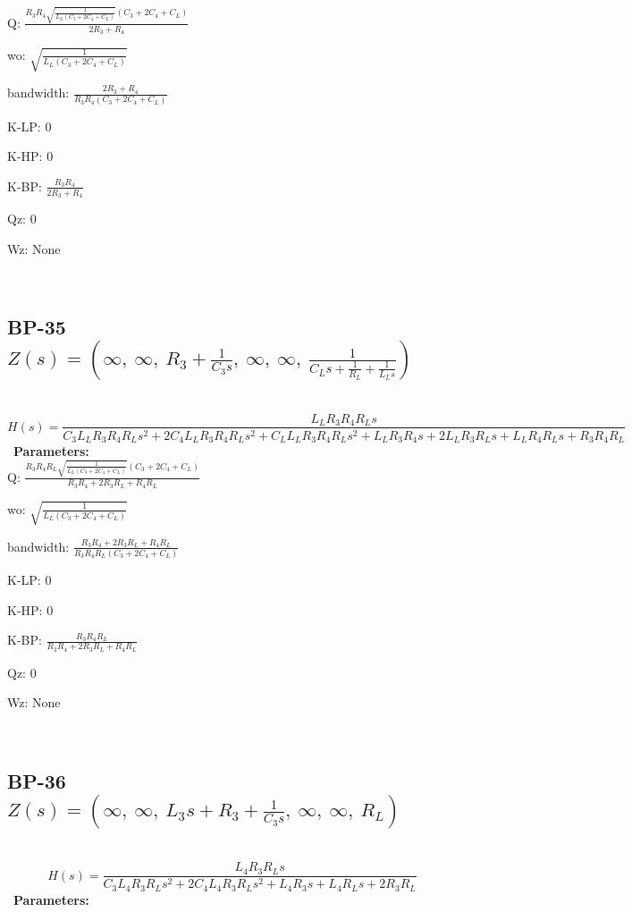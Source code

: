 \documentclass{article}
\begin{document}
Q: $\frac{R_{3} R_{4} \sqrt{\frac{1}{L_{L} \left(C_{3} + 2 C_{4} + C_{L}\right)}} \left(C_{3} + 2 C_{4} + C_{L}\right)}{2 R_{3} + R_{4}}$\ 

wo: $\sqrt{\frac{1}{L_{L} \left(C_{3} + 2 C_{4} + C_{L}\right)}}$\ 

bandwidth: $\frac{2 R_{3} + R_{4}}{R_{3} R_{4} \left(C_{3} + 2 C_{4} + C_{L}\right)}$\ 

K-LP: $0$\ 

K-HP: $0$\ 

K-BP: $\frac{R_{3} R_{4}}{2 R_{3} + R_{4}}$\ 

Qz: $0$\ 

Wz: $\text{None}$\ 

\ 

\subsection{BP-35 $Z(s) = \left( \infty, \  \infty, \  R_{3} + \frac{1}{C_{3} s}, \  \infty, \  \infty, \  \frac{1}{C_{L} s + \frac{1}{R_{L}} + \frac{1}{L_{L} s}}\right)$ } \ 
\textbf{\[H(s) = \frac{L_{L} R_{3} R_{4} R_{L} s}{C_{3} L_{L} R_{3} R_{4} R_{L} s^{2} + 2 C_{4} L_{L} R_{3} R_{4} R_{L} s^{2} + C_{L} L_{L} R_{3} R_{4} R_{L} s^{2} + L_{L} R_{3} R_{4} s + 2 L_{L} R_{3} R_{L} s + L_{L} R_{4} R_{L} s + R_{3} R_{4} R_{L}}\] } \ 
\textbf{Parameters:}\\ 

Q: $\frac{R_{3} R_{4} R_{L} \sqrt{\frac{1}{L_{L} \left(C_{3} + 2 C_{4} + C_{L}\right)}} \left(C_{3} + 2 C_{4} + C_{L}\right)}{R_{3} R_{4} + 2 R_{3} R_{L} + R_{4} R_{L}}$\ 

wo: $\sqrt{\frac{1}{L_{L} \left(C_{3} + 2 C_{4} + C_{L}\right)}}$\ 

bandwidth: $\frac{R_{3} R_{4} + 2 R_{3} R_{L} + R_{4} R_{L}}{R_{3} R_{4} R_{L} \left(C_{3} + 2 C_{4} + C_{L}\right)}$\ 

K-LP: $0$\ 

K-HP: $0$\ 

K-BP: $\frac{R_{3} R_{4} R_{L}}{R_{3} R_{4} + 2 R_{3} R_{L} + R_{4} R_{L}}$\ 

Qz: $0$\ 

Wz: $\text{None}$\ 

\ 

\subsection{BP-36 $Z(s) = \left( \infty, \  \infty, \  L_{3} s + R_{3} + \frac{1}{C_{3} s}, \  \infty, \  \infty, \  R_{L}\right)$ } \ 
\textbf{\[H(s) = \frac{L_{4} R_{3} R_{L} s}{C_{3} L_{4} R_{3} R_{L} s^{2} + 2 C_{4} L_{4} R_{3} R_{L} s^{2} + L_{4} R_{3} s + L_{4} R_{L} s + 2 R_{3} R_{L}}\] } \ 
\textbf{Parameters:}\\ 
\end{document}
